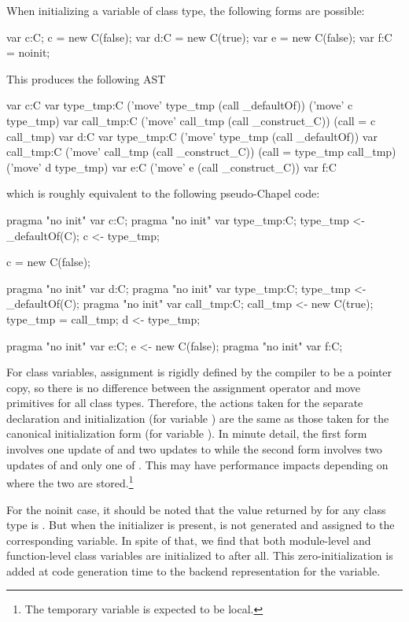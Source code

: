 When initializing a variable of class type, the following forms are possible:
\begin{chapel}
  var c:C; c = new C(false);
  var d:C = new C(true);
  var e = new C(false);
  var f:C = noinit;
\end{chapel}
\noindent
This produces the following AST
\begin{numberedchapel}
    var c:C
    {
      var type_tmp:C
      ('move' type_tmp (call _defaultOf))
      ('move' c type_tmp)
    }
    var call_tmp:C
    ('move' call_tmp (call _construct_C))
    (call = c call_tmp)
    var d:C
    {
      var type_tmp:C
      ('move' type_tmp (call _defaultOf))
      var call_tmp:C
      ('move' call_tmp (call _construct_C))
      (call = type_tmp call_tmp)
      ('move' d type_tmp)
    }
    var e:C
    ('move' e (call _construct_C))
    var f:C
\end{numberedchapel}
\noindent
which is roughly equivalent to the following pseudo-Chapel code:
\begin{chapel}
  pragma "no init" var c:C;
  pragma "no init" var type_tmp:C; type_tmp <- _defaultOf(C);
  c <- type_tmp;

  c = new C(false);

  pragma "no init" var d:C; 
  pragma "no init" var type_tmp:C; type_tmp <- _defaultOf(C);
  pragma "no init" var call_tmp:C; call_tmp <- new C(true);
  type_tmp = call_tmp;
  d <- type_tmp;

  pragma "no init" var e:C; e <- new C(false);
  pragma "no init" var f:C;
\end{chapel}
\noindent
For class variables, assignment is rigidly defined by the compiler to be a pointer copy,
so there is no difference between the assignment operator and move primitives for all
class types.  Therefore, the actions taken for the separate declaration and initialization
(for variable ) are the same as those taken for the canonical initialization form
(for variable ).  In minute detail, the first form involves one update of
 and two updates to  while the second form involves two updates of
 and only one of .  This may have performance impacts depending on
where the two are stored.\footnote{The temporary variable  is expected to
  be local.}

For the noinit case, it should be noted that the value returned by  for
any class type is .  But when the  initializer is present,
 is not generated and assigned to the corresponding variable.  In spite of
that, we find that both module-level and function-level class variables are initialized to
 after all.  This zero-initialization is added at code generation time to the
backend representation for the variable.  

